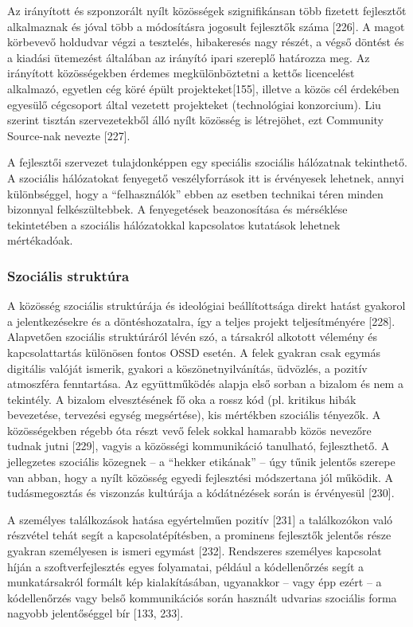\documentclass[12pt,magyar,a4paper,oneside]{scrreprt}
\begin{document}
Az irányított és szponzorált nyílt közösségek szignifikánsan több
fizetett fejlesztőt alkalmaznak és jóval több a módosításra jogosult
fejlesztők száma {[}226{]}. A magot körbevevő holdudvar végzi a
tesztelés, hibakeresés nagy részét, a végső döntést és a kiadási
ütemezést általában az irányító ipari szereplő határozza meg. Az
irányított közösségekben érdemes megkülönböztetni a kettős licencelést
alkalmazó, egyetlen cég köré épült projekteket{[}155{]}, illetve a közös
cél érdekében egyesülő cégcsoport által vezetett projekteket
(technológiai konzorcium). Liu szerint tisztán szervezetekből álló nyílt
közösség is létrejöhet, ezt Community Source-nak nevezte {[}227{]}.

A fejlesztői szervezet tulajdonképpen egy speciális szociális hálózatnak
tekinthető. A szociális hálózatokat fenyegető veszélyforrások itt is
érvényesek lehetnek, annyi különbséggel, hogy a ``felhasználók'' ebben
az esetben technikai téren minden bizonnyal felkészültebbek. A
fenyegetések beazonosítása és mérséklése tekintetében a szociális
hálózatokkal kapcsolatos kutatások lehetnek mértékadóak.

\hypertarget{szociuxe1lis-struktuxfara}{%
\subsubsection{Szociális struktúra}\label{szociuxe1lis-struktuxfara}}

A közösség szociális struktúrája és ideológiai beállítottsága direkt
hatást gyakorol a jelentkezésekre és a döntéshozatalra, így a teljes
projekt teljesítményére {[}228{]}. Alapvetően szociális struktúráról
lévén szó, a társakról alkotott vélemény és kapcsolattartás különösen
fontos OSSD esetén. A felek gyakran csak egymás digitális valóját
ismerik, gyakori a köszönetnyilvánítás, üdvözlés, a pozitív atmoszféra
fenntartása. Az együttműködés alapja első sorban a bizalom és nem a
tekintély. A bizalom elvesztésének fő oka a rossz kód (pl. kritikus
hibák bevezetése, tervezési egység megsértése), kis mértékben szociális
tényezők. A közösségekben régebb óta részt vevő felek sokkal hamarabb
közös nevezőre tudnak jutni {[}229{]}, vagyis a közösségi kommunikáció
tanulható, fejleszthető. A jellegzetes szociális közegnek -- a ``hekker
etikának'' -- úgy tűnik jelentős szerepe van abban, hogy a nyílt
közösség egyedi fejlesztési módszertana jól működik. A tudásmegosztás és
viszonzás kultúrája a kódátnézések során is érvényesül {[}230{]}.

A személyes találkozások hatása egyértelműen pozitív {[}231{]} a
találkozókon való részvétel tehát segít a kapcsolatépítésben, a
prominens fejlesztők jelentős része gyakran személyesen is ismeri
egymást {[}232{]}. Rendszeres személyes kapcsolat híján a
szoftverfejlesztés egyes folyamatai, például a kódellenőrzés segít a
munkatársakról formált kép kialakításában, ugyanakkor -- vagy épp ezért
-- a kódellenőrzés vagy belső kommunikációs során használt udvarias
szociális forma nagyobb jelentőséggel bír {[}133, 233{]}.
\end{document}
